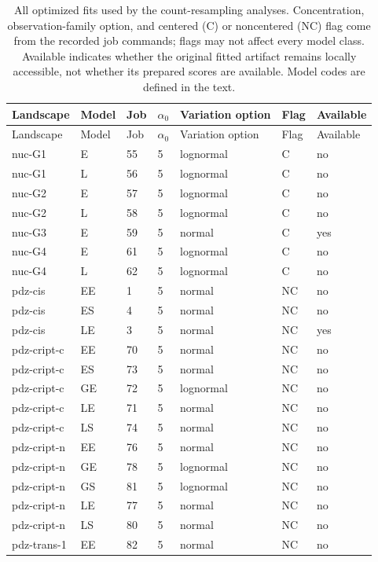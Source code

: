 \begin{longtable}[c]{lllllll}
\caption{All optimized fits used by the count-resampling analyses. Concentration, observation-family option, and centered (C) or noncentered (NC) flag come from the recorded job commands; flags may not affect every model class. Available indicates whether the original fitted artifact remains locally accessible, not whether its prepared scores are available. Model codes are defined in the text.}\label{tab:optimized-fits}\\
\toprule
Landscape & Model & Job & $\alpha_0$ & Variation option & Flag & Available \\
\midrule
\endfirsthead
\toprule
Landscape & Model & Job & $\alpha_0$ & Variation option & Flag & Available \\
\midrule
\endhead
\bottomrule
\endfoot
nuc-G1 & E & 55 & 5 & lognormal & C & no \\
nuc-G1 & L & 56 & 5 & lognormal & C & no \\
nuc-G2 & E & 57 & 5 & lognormal & C & no \\
nuc-G2 & L & 58 & 5 & lognormal & C & no \\
nuc-G3 & E & 59 & 5 & normal & C & yes \\
nuc-G4 & E & 61 & 5 & lognormal & C & no \\
nuc-G4 & L & 62 & 5 & lognormal & C & no \\
pdz-cis & EE & 1 & 5 & normal & NC & no \\
pdz-cis & ES & 4 & 5 & normal & NC & no \\
pdz-cis & LE & 3 & 5 & normal & NC & yes \\
pdz-cript-c & EE & 70 & 5 & normal & NC & no \\
pdz-cript-c & ES & 73 & 5 & normal & NC & no \\
pdz-cript-c & GE & 72 & 5 & lognormal & NC & no \\
pdz-cript-c & LE & 71 & 5 & normal & NC & no \\
pdz-cript-c & LS & 74 & 5 & normal & NC & no \\
pdz-cript-n & EE & 76 & 5 & normal & NC & no \\
pdz-cript-n & GE & 78 & 5 & lognormal & NC & no \\
pdz-cript-n & GS & 81 & 5 & lognormal & NC & no \\
pdz-cript-n & LE & 77 & 5 & normal & NC & no \\
pdz-cript-n & LS & 80 & 5 & normal & NC & no \\
pdz-trans-1 & EE & 82 & 5 & normal & NC & no \\

\end{longtable}
